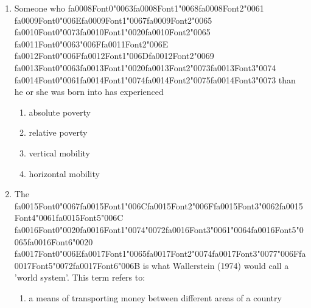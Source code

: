 \documentclass[12pt]{article}
\begin{document}
\begin{enumerate}[label=\arabic*.]
\begin{enumerate}[label=(\alph*)]
    \item elitists express concern with the Americanization of culture
\end{enumerate}
\item Someone who {\csname fa0008Font0\endcsname\char"0063}{\csname fa0008Font1\endcsname\char"0068}{\csname fa0008Font2\endcsname\char"0061} {\csname fa0009Font0\endcsname\char"006E}{\csname fa0009Font1\endcsname\char"0067}{\csname fa0009Font2\endcsname\char"0065} {\csname fa0010Font0\endcsname\char"0073}{\csname fa0010Font1\endcsname\char"0020}{\csname fa0010Font2\endcsname\char"0065} {\csname fa0011Font0\endcsname\char"0063}{\char"006F}{\csname fa0011Font2\endcsname\char"006E} {\csname fa0012Font0\endcsname\char"006F}{\csname fa0012Font1\endcsname\char"006D}{\csname fa0012Font2\endcsname\char"0069} {\csname fa0013Font0\endcsname\char"0063}{\csname fa0013Font1\endcsname\char"0020}{\csname fa0013Font2\endcsname\char"0073}{\csname fa0013Font3\endcsname\char"0074} {\csname fa0014Font0\endcsname\char"0061}{\csname fa0014Font1\endcsname\char"0074}{\csname fa0014Font2\endcsname\char"0075}{\csname fa0014Font3\endcsname\char"0073} than he or she was born into has experienced
\begin{enumerate}[label=(\alph*)]
    \item absolute poverty
    \item relative poverty
    \item vertical mobility
    \item horizontal mobility
\end{enumerate}
\item The {\csname fa0015Font0\endcsname\char"0067}{\csname fa0015Font1\endcsname\char"006C}{\csname fa0015Font2\endcsname\char"006F}{\csname fa0015Font3\endcsname\char"0062}{\csname fa0015Font4\endcsname\char"0061}{\csname fa0015Font5\endcsname\char"006C} {\csname fa0016Font0\endcsname\char"0020}{\csname fa0016Font1\endcsname\char"0074}{\char"0072}{\csname fa0016Font3\endcsname\char"0061}{\char"0064}{\csname fa0016Font5\endcsname\char"0065}{\csname fa0016Font6\endcsname\char"0020} {\csname fa0017Font0\endcsname\char"006E}{\csname fa0017Font1\endcsname\char"0065}{\csname fa0017Font2\endcsname\char"0074}{\csname fa0017Font3\endcsname\char"0077}{\char"006F}{\csname fa0017Font5\endcsname\char"0072}{\csname fa0017Font6\endcsname\char"006B} is what Wallerstein (1974) would call a 'world system'. This term refers to:
\begin{enumerate}[label=(\alph*)]
    \item a means of transporting money between different areas of a country

\end{enumerate}
\end{enumerate}
\end{document}
